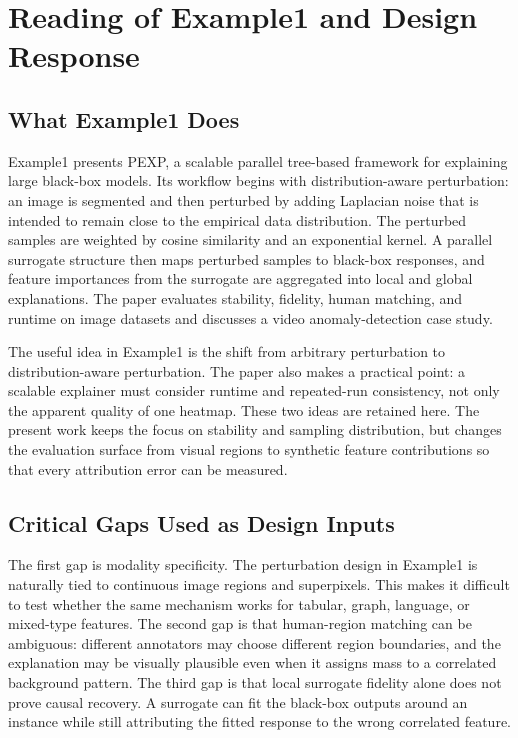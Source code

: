\documentclass[10pt,conference,letterpaper]{IEEEtran}
\begin{document}
\section{Reading of Example1 and Design Response}

\subsection{What Example1 Does}
Example1 presents PEXP, a scalable parallel tree-based framework for explaining large black-box models. Its workflow begins with distribution-aware perturbation: an image is segmented and then perturbed by adding Laplacian noise that is intended to remain close to the empirical data distribution. The perturbed samples are weighted by cosine similarity and an exponential kernel. A parallel surrogate structure then maps perturbed samples to black-box responses, and feature importances from the surrogate are aggregated into local and global explanations. The paper evaluates stability, fidelity, human matching, and runtime on image datasets and discusses a video anomaly-detection case study.

The useful idea in Example1 is the shift from arbitrary perturbation to distribution-aware perturbation. The paper also makes a practical point: a scalable explainer must consider runtime and repeated-run consistency, not only the apparent quality of one heatmap. These two ideas are retained here. The present work keeps the focus on stability and sampling distribution, but changes the evaluation surface from visual regions to synthetic feature contributions so that every attribution error can be measured.

\subsection{Critical Gaps Used as Design Inputs}
The first gap is modality specificity. The perturbation design in Example1 is naturally tied to continuous image regions and superpixels. This makes it difficult to test whether the same mechanism works for tabular, graph, language, or mixed-type features. The second gap is that human-region matching can be ambiguous: different annotators may choose different region boundaries, and the explanation may be visually plausible even when it assigns mass to a correlated background pattern. The third gap is that local surrogate fidelity alone does not prove causal recovery. A surrogate can fit the black-box outputs around an instance while still attributing the fitted response to the wrong correlated feature.
\end{document}
